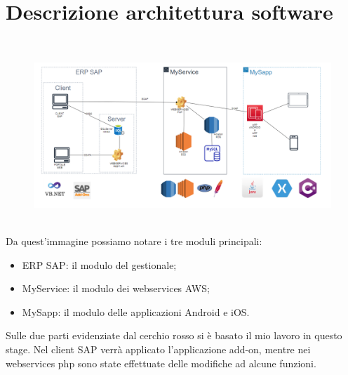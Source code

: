 
\chapter{Descrizione architettura software}
\label{cap:descrizione-architettura}

\\
\begin{figure}[!h] 
	\centering 
	\includegraphics[scale = 0.45]{immagini/architettura-globale.png} 
\end{figure}\\
Da quest'immagine possiamo notare i tre moduli principali:
\begin{itemize}
	\item {ERP SAP:} il modulo del gestionale;
	\item {MyService:} il modulo dei webservices AWS;
	\item {MySapp:} il modulo delle applicazioni Android e iOS.\\
\end{itemize}
Sulle due parti evidenziate dal cerchio rosso si è basato il mio lavoro in questo stage.
Nel client SAP verrà applicato l'applicazione add-on, mentre nei webservices php sono state effettuate delle modifiche ad alcune funzioni.
